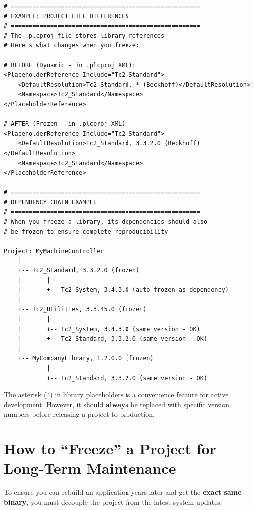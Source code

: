 \documentclass[11pt,a4paper]{article}
\begin{document}
\begin{lstlisting}[style=configstyle]
# =====================================================
# EXAMPLE: PROJECT FILE DIFFERENCES
# =====================================================
# The .plcproj file stores library references
# Here's what changes when you freeze:

# BEFORE (Dynamic - in .plcproj XML):
<PlaceholderReference Include="Tc2_Standard">
    <DefaultResolution>Tc2_Standard, * (Beckhoff)</DefaultResolution>
    <Namespace>Tc2_Standard</Namespace>
</PlaceholderReference>

# AFTER (Frozen - in .plcproj XML):
<PlaceholderReference Include="Tc2_Standard">
    <DefaultResolution>Tc2_Standard, 3.3.2.0 (Beckhoff)</DefaultResolution>
    <Namespace>Tc2_Standard</Namespace>
</PlaceholderReference>

# =====================================================
# DEPENDENCY CHAIN EXAMPLE
# =====================================================
# When you freeze a library, its dependencies should also
# be frozen to ensure complete reproducibility

Project: MyMachineController
    |
    +-- Tc2_Standard, 3.3.2.0 (frozen)
    |       |
    |       +-- Tc2_System, 3.4.3.0 (auto-frozen as dependency)
    |
    +-- Tc2_Utilities, 3.3.45.0 (frozen)
    |       |
    |       +-- Tc2_System, 3.4.3.0 (same version - OK)
    |       +-- Tc2_Standard, 3.3.2.0 (same version - OK)
    |
    +-- MyCompanyLibrary, 1.2.0.0 (frozen)
            |
            +-- Tc2_Standard, 3.3.2.0 (same version - OK)
\end{lstlisting}

\begin{notebox}
The asterisk (*) in library placeholders is a convenience feature for active development. However, it should \textbf{always} be replaced with specific version numbers before releasing a project to production.
\end{notebox}

\section{How to ``Freeze'' a Project for Long-Term Maintenance}

To ensure you can rebuild an application years later and get the \textbf{exact same binary}, you must decouple the project from the latest system updates.
\end{document}

